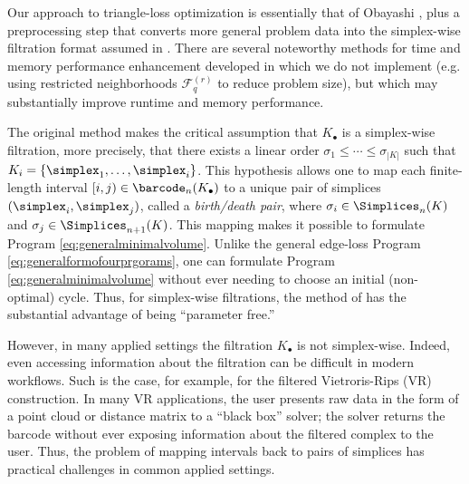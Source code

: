 Our approach to triangle-loss optimization is essentially that of Obayashi \cite{Obayashi2018}, plus a preprocessing step that converts more general problem data into the simplex-wise filtration format assumed in \cite{Obayashi2018}.  There are several noteworthy methods for time and memory performance enhancement developed in \cite{Obayashi2018}  which we do not implement (e.g.  using restricted neighborhoods $\mathcal{F}_q^{(r)}$ to reduce problem size), but which may substantially improve runtime and memory performance.

The original method makes the critical assumption that $K_\bullet$ is a simplex-wise filtration, more precisely, that there exists a linear order $\sigma_1 \le \cdots \le \sigma_{|K|}$ such that $K_i = \{\simplex_1, \ldots, \simplex_i\}$. This hypothesis allows one to map each finite-length interval $[i,j) \in \barcode_n(K_\bullet)$ to a unique pair of simplices $(\simplex_i, \simplex_j)$, called a \emph{birth/death pair}, where  $\sigma_i \in \Simplices_n(K)$ and $\sigma_j \in \Simplices_{n+1}(K)$.    This mapping makes it possible to formulate Program \eqref{eq:generalminimalvolume}. Unlike the general edge-loss Program \eqref{eq:generalformofourprgorams}, one can formulate Program \eqref{eq:generalminimalvolume} without ever needing to choose an initial (non-optimal) cycle.  Thus, for simplex-wise filtrations, the method of \cite{Obayashi2018} has the substantial advantage of being ``parameter free.''


However, in many applied settings the filtration $K_\bullet$ is not simplex-wise.   Indeed, even accessing information about the filtration can be difficult in modern workflows.  Such is the case, for example, for the filtered Vietroris-Rips (VR) construction. In many VR applications, the user  presents raw data in the form of a point cloud or distance matrix to a ``black box'' solver; the solver returns the barcode without ever exposing information about the filtered complex to the user. Thus, the problem of mapping intervals back to pairs of simplices has practical challenges in common applied settings.





